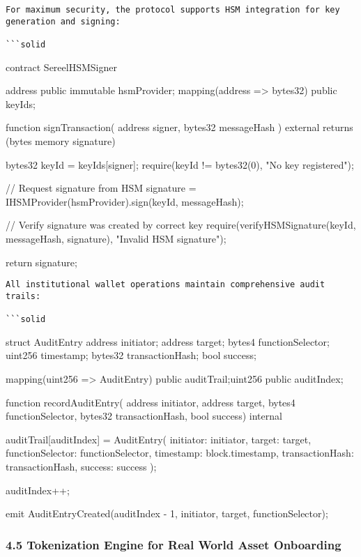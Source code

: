 \documentclass[12pt]{article}
\begin{document}
\begin{lstlisting}
For maximum security, the protocol supports HSM integration for key generation and signing:

```solid
\end{lstlisting}
contract SereelHSMSigner {    address public immutable hsmProvider;    mapping(address => bytes32) public keyIds;

    function signTransaction(        address signer,        bytes32 messageHash    ) external returns (bytes memory signature) {        bytes32 keyId = keyIds[signer];        require(keyId != bytes32(0), "No key registered");

        // Request signature from HSM        signature = IHSMProvider(hsmProvider).sign(keyId, messageHash);

        // Verify signature was created by correct key        require(verifyHSMSignature(keyId, messageHash, signature), "Invalid HSM signature");

        return signature;    }}

\begin{lstlisting}
All institutional wallet operations maintain comprehensive audit trails:

```solid
\end{lstlisting}
struct AuditEntry {    address initiator;    address target;    bytes4 functionSelector;    uint256 timestamp;    bytes32 transactionHash;    bool success;}

mapping(uint256 => AuditEntry) public auditTrail;uint256 public auditIndex;

function recordAuditEntry(    address initiator,    address target,    bytes4 functionSelector,    bytes32 transactionHash,    bool success) internal {    auditTrail[auditIndex] = AuditEntry({        initiator: initiator,        target: target,        functionSelector: functionSelector,        timestamp: block.timestamp,        transactionHash: transactionHash,        success: success    });

    auditIndex++;

    emit AuditEntryCreated(auditIndex - 1, initiator, target, functionSelector);}
\subsubsection{4.5 Tokenization Engine for Real World Asset Onboarding} %
\end{document}
